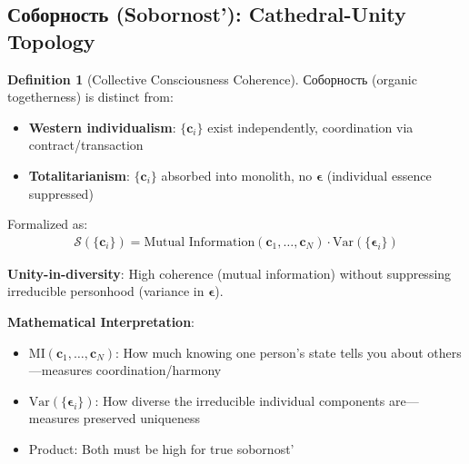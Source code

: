\documentclass[11pt,a4paper]{article}
\theoremstyle{definition}
\newtheorem{definition}{Definition}[section]
\theoremstyle{remark}
\newcommand{\cc}{\mathbf{c}}
\begin{document}
\begin{enumerate}
\subsection{Соборность (Sobornost'): Cathedral-Unity Topology}

\begin{definition}[Collective Consciousness Coherence]
Соборность (organic togetherness) is distinct from:
\begin{itemize}
\item \textbf{Western individualism}: \(\{\cc_i\}\) exist independently, coordination via contract/transaction
\item \textbf{Totalitarianism}: \(\{\cc_i\}\) absorbed into monolith, no \(\boldsymbol{\epsilon}\) (individual essence suppressed)
\end{itemize}

Formalized as:
\begin{align}
\mathcal{S}(\{\cc_i\}) = \text{Mutual Information}(\cc_1, \ldots, \cc_N) \cdot \text{Var}(\{\boldsymbol{\epsilon}_i\})
\end{align}

\textbf{Unity-in-diversity}: High coherence (mutual information) without suppressing irreducible personhood (variance in \(\boldsymbol{\epsilon}\)).

\textbf{Mathematical Interpretation}:
\begin{itemize}
    \item \(\text{MI}(\cc_1, \ldots, \cc_N)\): How much knowing one person's state tells you about others—measures coordination/harmony
    \item \(\text{Var}(\{\boldsymbol{\epsilon}_i\})\): How diverse the irreducible individual components are—measures preserved uniqueness
    \item Product: Both must be high for true sobornost'
\end{itemize}
\end{definition}

\begin{figure}[H]
\centering
{}
\end{figure}
\end{enumerate}
\end{document}
